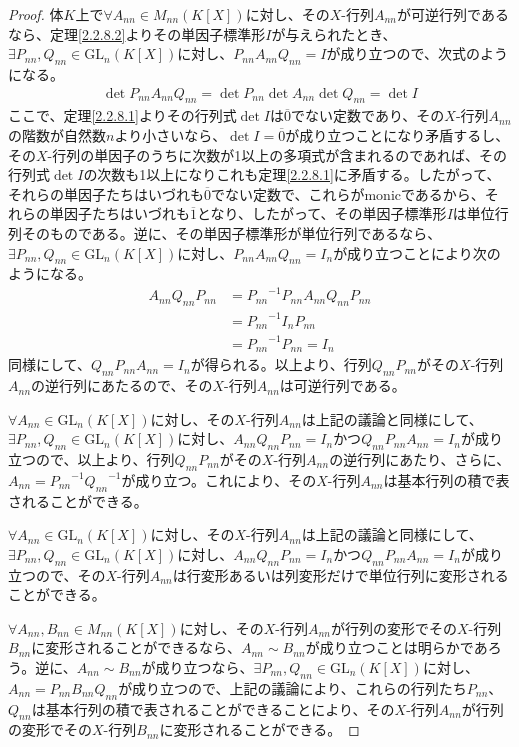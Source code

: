 \documentclass[dvipdfmx]{jsarticle}
\begin{document}
\begin{proof}
体$K$上で$\forall A_{nn} \in M_{nn}\left( K[ X] \right)$に対し、その$X$-行列$A_{nn}$が可逆行列であるなら、定理\ref{2.2.8.2}よりその単因子標準形$I$が与えられたとき、$\exists P_{nn},Q_{nn} \in {\mathrm{GL}}_{n}\left( K[ X] \right)$に対し、$P_{nn}A_{nn}Q_{nn} = I$が成り立つので、次式のようになる。
\begin{align*}
\det{P_{nn}A_{nn}Q_{nn}} = \det{P_{nn}}\det{A_{nn}}\det{Q_{nn}} = \det I
\end{align*}
ここで、定理\ref{2.2.8.1}よりその行列式$\det I$は$\overline{0}$でない定数であり、その$X$-行列$A_{nn}$の階数が自然数$n$より小さいなら、$\det I = \overline{0}$が成り立つことになり矛盾するし、その$X$-行列の単因子のうちに次数が1以上の多項式が含まれるのであれば、その行列式$\det I$の次数も1以上になりこれも定理\ref{2.2.8.1}に矛盾する。したがって、それらの単因子たちはいづれも$\overline{0}$でない定数で、これらがmonicであるから、それらの単因子たちはいづれも$\overline{1}$となり、したがって、その単因子標準形$I$は単位行列そのものである。逆に、その単因子標準形が単位行列であるなら、$\exists P_{nn},Q_{nn} \in {\mathrm{GL}}_{n}\left( K[ X] \right)$に対し、$P_{nn}A_{nn}Q_{nn} = I_{n}$が成り立つことにより次のようになる。
\begin{align*}
A_{nn}Q_{nn}P_{nn} &= {P_{nn}}^{- 1}P_{nn}A_{nn}Q_{nn}P_{nn}\\
&= {P_{nn}}^{- 1}I_{n}P_{nn}\\
&= {P_{nn}}^{- 1}P_{nn} = I_{n}
\end{align*}
同様にして、$Q_{nn}P_{nn}A_{nn} = I_{n}$が得られる。以上より、行列$Q_{nn}P_{nn}$がその$X$-行列$A_{nn}$の逆行列にあたるので、その$X$-行列$A_{nn}$は可逆行列である。\par
$\forall A_{nn} \in {\mathrm{GL}}_{n}\left( K[ X] \right)$に対し、その$X$-行列$A_{nn}$は上記の議論と同様にして、$\exists P_{nn},Q_{nn} \in {\mathrm{GL}}_{n}\left( K[ X] \right)$に対し、$A_{nn}Q_{nn}P_{nn} = I_{n}$かつ$Q_{nn}P_{nn}A_{nn} = I_{n}$が成り立つので、以上より、行列$Q_{nn}P_{nn}$がその$X$-行列$A_{nn}$の逆行列にあたり、さらに、$A_{nn} = {P_{nn}}^{- 1}{Q_{nn}}^{- 1}$が成り立つ。これにより、その$X$-行列$A_{nn}$は基本行列の積で表されることができる。\par
$\forall A_{nn} \in {\mathrm{GL}}_{n}\left( K[ X] \right)$に対し、その$X$-行列$A_{nn}$は上記の議論と同様にして、$\exists P_{nn},Q_{nn} \in {\mathrm{GL}}_{n}\left( K[ X] \right)$に対し、$A_{nn}Q_{nn}P_{nn} = I_{n}$かつ$Q_{nn}P_{nn}A_{nn} = I_{n}$が成り立つので、その$X$-行列$A_{nn}$は行変形あるいは列変形だけで単位行列に変形されることができる。\par
$\forall A_{nn},B_{nn} \in M_{nn}\left( K[ X] \right)$に対し、その$X$-行列$A_{nn}$が行列の変形でその$X$-行列$B_{nn}$に変形されることができるなら、$A_{nn} \sim B_{nn}$が成り立つことは明らかであろう。逆に、$A_{nn} \sim B_{nn}$が成り立つなら、$\exists P_{nn},Q_{nn} \in {\mathrm{GL}}_{n}\left( K[ X] \right)$に対し、$A_{nn} = P_{nn}B_{nn}Q_{nn}$が成り立つので、上記の議論により、これらの行列たち$P_{nn}$、$Q_{nn}$は基本行列の積で表されることができることにより、その$X$-行列$A_{nn}$が行列の変形でその$X$-行列$B_{nn}$に変形されることができる。
\end{proof}
\end{document}
